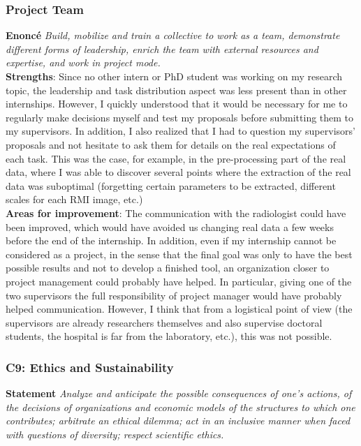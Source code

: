 \documentclass[preprint,12pt]{elsarticle}
\begin{document}
\subsubsection{Project Team}

\noindent \textbf{Enoncé} \textit{Build, mobilize and train a collective to work as a team, demonstrate different forms of leadership, enrich the team with external resources and expertise, and work in project mode.}\\[3 pt]

\noindent \textbf{Strengths}: Since no other intern or PhD student was working on my research topic, the leadership and task distribution aspect was less present than in other internships. However, I quickly understood that it would be necessary for me to regularly make decisions myself and test my proposals before submitting them to my supervisors. In addition, I also realized that I had to question my supervisors' proposals and not hesitate to ask them for details on the real expectations of each task. This was the case, for example, in the pre-processing part of the real data, where I was able to discover several points where the extraction of the real data was suboptimal (forgetting certain parameters to be extracted, different scales for each RMI image, etc.)\\[3 pt]

\noindent \textbf{Areas for improvement}: The communication with the radiologist could have been improved, which would have avoided us changing real data a few weeks before the end of the internship. In addition, even if my internship cannot be considered as a project, in the sense that the final goal was only to have the best possible results and not to develop a finished tool, an organization closer to project management could probably have helped. In particular, giving one of the two supervisors the full responsibility of project manager would have probably helped communication. However, I think that from a logistical point of view (the supervisors are already researchers themselves and also supervise doctoral students, the hospital is far from the laboratory, etc.), this was not possible.

\subsubsection{C9: Ethics and Sustainability}

\noindent \textbf{Statement} \textit{Analyze and anticipate the possible consequences of one's actions, of the decisions of organizations and economic models of the structures to which one contributes; arbitrate an ethical dilemma; act in an inclusive manner when faced with questions of diversity; respect scientific ethics.}\\[3 pt]
\end{document}
